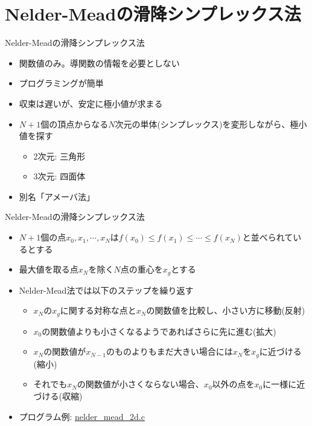 \section{Nelder-Meadの滑降シンプレックス法}

\begin{frame}[t,fragile]{Nelder-Meadの滑降シンプレックス法}
  \begin{itemize}
    \setlength{\itemsep}{1em}
  \item 関数値のみ。導関数の情報を必要としない
  \item プログラミングが簡単
  \item 収束は遅いが、安定に極小値が求まる
  \item $N+1$個の頂点からなる$N$次元の単体(シンプレックス)を変形しながら、極小値を探す
    \begin{itemize}
    \item 2次元: 三角形
    \item 3次元: 四面体
    \end{itemize}
  \item 別名「アメーバ法」
  \end{itemize}
\end{frame}

\begin{frame}[t,fragile]{Nelder-Meadの滑降シンプレックス法}
  \begin{itemize}
  \item $N+1$個の点$x_0,x_1,\cdots,x_N$は$f(x_0) \le f(x_1) \le \cdots \le f(x_N)$と並べられているとする
  \item 最大値を取る点$x_N$を除く$N$点の重心を$x_g$とする
  \item Nelder-Mead法では以下のステップを繰り返す
    \begin{itemize}
      \item $x_N$の$x_g$に関する対称な点と$x_N$の関数値を比較し、小さい方に移動(反射)
      \item $x_0$の関数値よりも小さくなるようであればさらに先に進む(拡大)
      \item $x_N$の関数値が$x_{N-1}$のものよりもまだ大きい場合には$x_N$を$x_g$に近づける(縮小)
      \item それでも$x_N$の関数値が小さくならない場合、$x_0$以外の点を$x_0$に一様に近づける(収縮)
    \end{itemize}
  \item プログラム例: \href{https://github.com/todo-group/computer-experiments/blob/master/exercise/optimization/nelder_mead_2d.c}{nelder\_mead\_2d.c}
  \end{itemize}
\end{frame}

